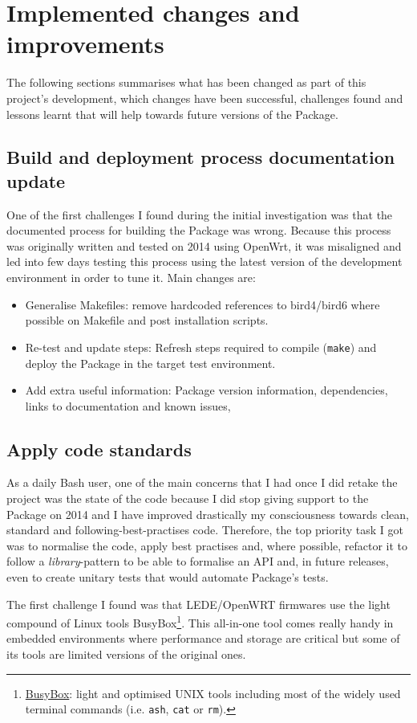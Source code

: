 \section{Implemented changes and improvements}
The following sections summarises what has been changed as part of this project's development, which changes have been successful, challenges found and lessons learnt that will help towards future versions of the Package.

\subsection{Build and deployment process documentation update}
One of the first challenges I found during the initial investigation was that the documented process for building the Package was wrong. Because this process was originally written and tested on 2014 using OpenWrt, it was misaligned and  led into few days testing this process using the latest version of the development environment in order to tune it. Main changes are:

\begin{itemize}
    \item Generalise Makefiles: remove hardcoded references to bird4/bird6 where possible on Makefile and post installation scripts.
    \item Re-test and update steps: Refresh steps required to compile (\texttt{make}) and deploy the Package in the target test environment.
    \item Add extra useful information: Package version information, dependencies, links to documentation and known issues,  \end{itemize}

\subsection{Apply code standards}
As a daily Bash user, one of the main concerns that I had once I did retake the project was the state of the code because I did stop giving support to the Package on 2014 and I have improved drastically my consciousness towards clean, standard and following-best-practises code. Therefore, the top priority task I got was to normalise the code, apply best practises and, where possible, refactor it to follow a \textit{library}-pattern to be able to formalise an API and, in future releases, even to create unitary tests that would automate Package's tests.

The first challenge I found was that LEDE/OpenWRT firmwares use the light compound of Linux tools BusyBox\footnote{\href{https://busybox.net/downloads/BusyBox.html}{BusyBox}: light and optimised UNIX tools including most of the widely used terminal commands (i.e. \texttt{ash}, \texttt{cat} or \texttt{rm}).}. This all-in-one tool comes really handy in embedded environments where performance and storage are critical but some of its tools are limited versions of the original ones.

